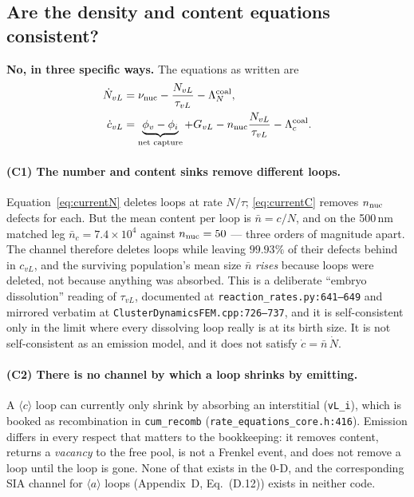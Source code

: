\documentclass[11pt]{article}
\newcommand{\aloop}{\ensuremath{\langle a\rangle}}
\newcommand{\cloop}{\ensuremath{\langle c\rangle}}
\newcommand{\fbk}{\discretionary{}{}{}}   %
\newcommand{\file}[1]{\texttt{\small #1}}
\begin{document}
\subsection{Are the density and content equations consistent?}
\label{sec:consistency}

\textbf{No, in three specific ways.}  The equations as written are
\begin{align}
\dot N_{vL} &= \nu_{\rm nuc} - \frac{N_{vL}}{\tau_{vL}} - \Lambda^{\rm coal}_N ,
\label{eq:currentN}\\
\dot c_{vL} &= \underbrace{\phi_v - \phi_i}_{\text{net capture}} + G_{vL}
             - n_{\rm nuc}\frac{N_{vL}}{\tau_{vL}} - \Lambda^{\rm coal}_c .
\label{eq:currentC}
\end{align}

\paragraph{(C1) The number and content sinks remove different loops.}
Equation~\eqref{eq:currentN} deletes loops at rate $N/\tau$;
\eqref{eq:currentC} removes $n_{\rm nuc}$ defects for each.  But the mean
content per loop is $\bar n = c/N$, and on the 500\,nm matched leg
$\bar n_c = 7.4\times10^{4}$ against $n_{\rm nuc}=50$ --- three orders of
magnitude apart.  The channel therefore deletes loops while leaving
$99.93\%$ of their defects behind in $c_{vL}$, and the surviving population's
mean size $\bar n$ \emph{rises} because loops were deleted, not because
anything was absorbed.  This is a deliberate ``embryo dissolution'' reading of
$\tau_{vL}$, documented at
\file{reaction\_\fbk rates.\fbk py:641--649} and mirrored verbatim at
\file{ClusterDynamicsFEM.\fbk cpp:726--737}, and it is self-consistent only in
the limit where every dissolving loop really is at its birth size.  It is not
self-consistent as an emission model, and it does not satisfy
$\dot c = \bar n\,\dot N$.

\paragraph{(C2) There is no channel by which a loop shrinks by emitting.}
A \cloop{} loop can currently only shrink by absorbing an interstitial
(\verb|vL_i|), which is booked as recombination in \verb|cum_recomb|
(\file{rate\_\fbk equations\_\fbk core.\fbk h:416}).  Emission differs in
every respect that matters to the bookkeeping: it removes content, returns a
\emph{vacancy} to the free pool, is not a Frenkel event, and does not remove a
loop until the loop is gone.  None of that exists in the 0-D, and the
corresponding SIA channel for \aloop{} loops (Appendix~D, Eq.~(D.12)) exists
in neither code.
\end{document}
